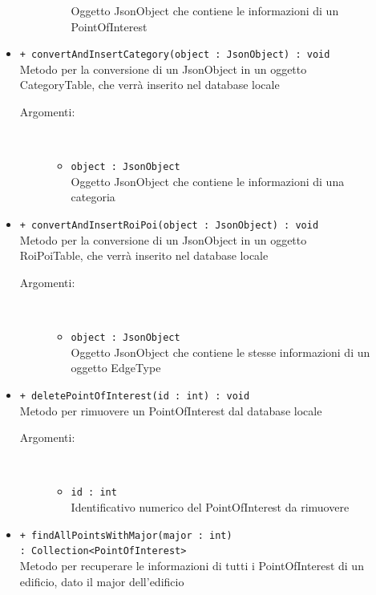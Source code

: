 \documentclass[../DefinizioneDiProdotto.tex]{subfiles}
\begin{document}
\begin{description}
\begin{itemize}
\begin{description}
\begin{itemize}
				Oggetto JsonObject che contiene le informazioni di un PointOfInterest\end{itemize}
		\end{description}
		\item \texttt{+ convertAndInsertCategory(object : JsonObject) : void}\\
		Metodo per la conversione di un JsonObject in un oggetto CategoryTable, che verrà inserito nel database locale
		\begin{description}
			\item[Argomenti:] \
			\begin{itemize}
				\item \texttt{object : JsonObject}\\
				Oggetto JsonObject che contiene le informazioni di una categoria\end{itemize}
		\end{description}
		\item \texttt{+ convertAndInsertRoiPoi(object : JsonObject) : void}\\
		Metodo per la conversione di un JsonObject in un oggetto RoiPoiTable, che verrà inserito nel database locale
		\begin{description}
			\item[Argomenti:] \
			\begin{itemize}
				\item \texttt{object : JsonObject}\\
				Oggetto JsonObject che contiene le stesse informazioni di un oggetto EdgeType\end{itemize}
		\end{description}
		\item \texttt{+ deletePointOfInterest(id : int) : void}\\
		Metodo per rimuovere un PointOfInterest dal database locale
		\begin{description}
			\item[Argomenti:] \
			\begin{itemize}
				\item \texttt{id : int}\\
				Identificativo numerico del PointOfInterest da rimuovere\end{itemize}
		\end{description}
		\item \texttt{+ findAllPointsWithMajor(major : int) \\ : Collection<PointOfInterest>}\\
		Metodo per recuperare le informazioni di tutti i PointOfInterest di un edificio, dato il major dell'edificio

\end{itemize}
\end{description}
\end{document}
